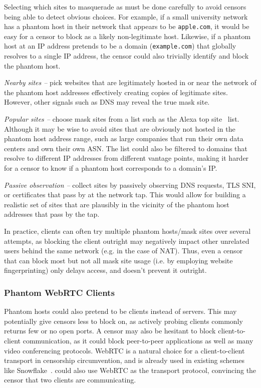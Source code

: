 \documentclass[sigconf,anonymous]{acmart}
\begin{document}
Selecting which sites to masquerade as must be done carefully to avoid censors
being able to detect obvious choices. For example, if a small university network
has a phantom host in their network that appears to be \texttt{apple.com}, it
would be easy for a censor to block as a likely non-legitimate host. Likewise,
if a phantom host at an IP address pretends to be a domain (\texttt{example.com}) that
globally resolves to a single IP address, the censor could also trivially
identify and block the phantom host.

\textit{Nearby sites --} pick websites that are
legitimately hosted in or near the network of the phantom host addresses
effectively creating copies of legitimate sites. However, other signals such as 
DNS may reveal the true mask site.

\textit{Popular sites --} choose mask sites from a list such as the Alexa
top site~\cite{alexa-top500} list. Although it may be wise to avoid
sites that are obviously not hosted in the phantom host address range, such as
large companies that run their own data centers and own their own ASN.
The list could also be filtered to domains that resolve to different IP
addresses from different vantage points, making it harder for a censor to know
if a phantom host corresponds to a domain's IP.

\textit{Passive observation --} collect sites by passively observing DNS requests, TLS
SNI, or certificates that pass by at the network tap. This would allow for building a realistic set
of sites that are plausibly in the vicinity of the phantom host addresses
that pass by the tap. 

In practice, clients can often try multiple phantom hosts/mask sites over
several attempts, as blocking the client outright may negatively impact other
unrelated users behind the same network (e.g. in the case of NAT). Thus, even a
censor that can block most but not all mask site usage (i.e. by employing 
website fingerprinting) only delays access, and doesn't prevent it outright.

\subsubsection{Phantom WebRTC Clients}
\label{sec:webrtc}

Phantom hosts could also pretend to be clients instead of servers. This may
potentially give censors less to block on, as actively probing clients commonly
returns few or no open ports. A censor may also be hesitant to block
client-to-client communication, as it could block peer-to-peer applications as
well as many video conferencing protocols. WebRTC is a
natural choice for a client-to-client transport in censorship circumvention,
and is already used in existing schemes like
Snowflake~\cite{snowflake}. \scheme could also use WebRTC as the
transport protocol, convincing the censor that two clients are communicating.
\end{document}
